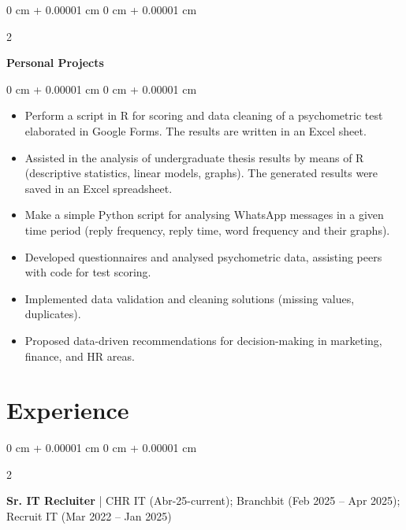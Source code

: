 \documentclass[10pt, a4paper]{article}
\newenvironment{highlights}{
    \begin{itemize}[
        topsep=0.10 cm,
        parsep=0.10 cm,
        partopsep=0pt,
        itemsep=0pt,
        leftmargin=0 cm + 10pt
    ]
}{
    \end{itemize}
} %
\newenvironment{onecolentry}{
    \begin{adjustwidth}{
        0 cm + 0.00001 cm
    }{
        0 cm + 0.00001 cm
    }
}{
    \end{adjustwidth}
} %
\newenvironment{twocolentry}[2][]{
    \onecolentry
    \def\secondColumn{#2}
    \setcolumnwidth{\fill, 4.5 cm}
    \begin{paracol}{2}
}{
    \switchcolumn \raggedleft \secondColumn
    \end{paracol}
    \endonecolentry
} %
\begin{document}
        \vspace{0.2 cm}

    \begin{twocolentry}{
            
        } 
            \textbf{Personal Projects}\end{twocolentry}

        \vspace{0.10 cm}
        \begin{onecolentry}
            \begin{highlights}
                \item Perform a script in R for scoring and data cleaning of a psychometric test elaborated in Google Forms. The results are written in an Excel sheet. 
                \item Assisted in the analysis of undergraduate thesis results by means of R (descriptive statistics, linear models, graphs). The generated results were saved in an Excel spreadsheet.
                \item Make a simple Python script for analysing WhatsApp messages in a given time period (reply frequency, reply time, word frequency and their graphs).
                \item Developed questionnaires and analysed psychometric data, assisting peers with code for test scoring.
                \item Implemented data validation and cleaning solutions (missing values, duplicates).
                \item Proposed data-driven recommendations for decision-making in marketing, finance, and HR areas.
            \end{highlights}
        \end{onecolentry}
        

        \vspace{0.2 cm}
        
\newpage
    \section{Experience}

 \begin{twocolentry}{
        }
            \textbf{Sr. IT Recluiter} | CHR IT (Abr-25-current); Branchbit (Feb 2025 – Apr 2025); Recruit IT (Mar 2022 – Jan 2025)\end{twocolentry}
\end{document}
